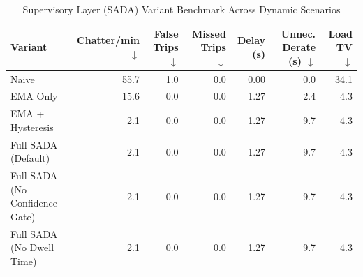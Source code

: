 \begin{table}[htbp]
\centering
\caption{Supervisory Layer (SADA) Variant Benchmark Across Dynamic Scenarios}
\label{tab:sada_variants}
\begin{tabular}{lrrrrrr}
\toprule
Variant & Chatter/min $\downarrow$ & False Trips $\downarrow$ & Missed Trips $\downarrow$ & Delay (s) & Unnec. Derate (s) $\downarrow$ & Load TV $\downarrow$ \\
\midrule
Naive & 55.7 & 1.0 & 0.0 & 0.00 & 0.0 & 34.1 \\
EMA Only & 15.6 & 0.0 & 0.0 & 1.27 & 2.4 & 4.3 \\
EMA + Hysteresis & 2.1 & 0.0 & 0.0 & 1.27 & 9.7 & 4.3 \\
Full SADA (Default) & 2.1 & 0.0 & 0.0 & 1.27 & 9.7 & 4.3 \\
Full SADA (No Confidence Gate) & 2.1 & 0.0 & 0.0 & 1.27 & 9.7 & 4.3 \\
Full SADA (No Dwell Time) & 2.1 & 0.0 & 0.0 & 1.27 & 9.7 & 4.3 \\
\bottomrule
\end{tabular}
\end{table}